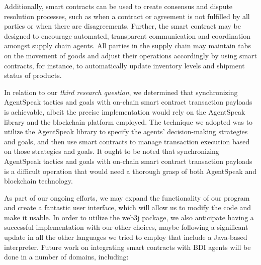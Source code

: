 Additionally, smart contracts can be used to create consensus and dispute resolution processes, such as when a contract or agreement is not fulfilled by all parties or when there are disagreements. Further, the smart contract may be designed to encourage automated, transparent communication and coordination amongst supply chain agents. All parties in the supply chain may maintain tabs on the movement of goods and adjust their operations accordingly by using smart contracts, for instance, to automatically update inventory levels and shipment status of products.

\vspace{.5cm}

In relation to our \textit{third research question}, we determined that synchronizing AgentSpeak tactics and goals with on-chain smart contract transaction payloads is achievable, albeit the precise implementation would rely on the AgentSpeak library and the blockchain platform employed. The technique we adopted was to utilize the AgentSpeak library to specify the agents' decision-making strategies and goals, and then use smart contracts to manage transaction execution based on those strategies and goals. It ought to be noted that synchronizing AgentSpeak tactics and goals with on-chain smart contract transaction payloads is a difficult operation that would need a thorough grasp of both AgentSpeak and blockchain technology.
\vspace{.5cm}

As part of our ongoing efforts, we may expand the functionality of our program and create a fantastic user interface, which will allow us to modify the code and make it usable. In order to utilize the web3j package, we also anticipate having a successful implementation with our other choices, maybe following a significant update in all the other languages we tried to employ that include a Java-based interpreter. Future work on integrating smart contracts with \ac{BDI} agents will be done in a number of domains, including:

